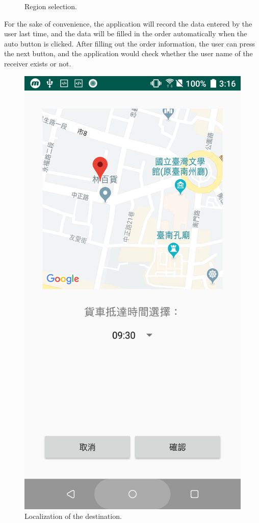 \documentclass[12pt]{ksthesis}
\begin{document}
\begin{thesis}
{\begin{figure}[H]
\caption{Region selection.}
\label{Region_selection}
\end{figure}


For the sake of convenience, the application will record the data entered by the user last time, and the data will be filled in the order automatically when the auto button is clicked. After filling out the order information, the user can press the next button, and the application would check whether the user name of the receiver exists or not.

\begin{figure}[H]
\centering
\includegraphics[scale=0.125]{./figures/F4-5-Localization.PNG}
\caption{\large Localization of the destination.}
\vspace{0.5cm}
\label{Fig:localization_of_destination}
\end{figure} 

}
\end{thesis}
\end{document}
